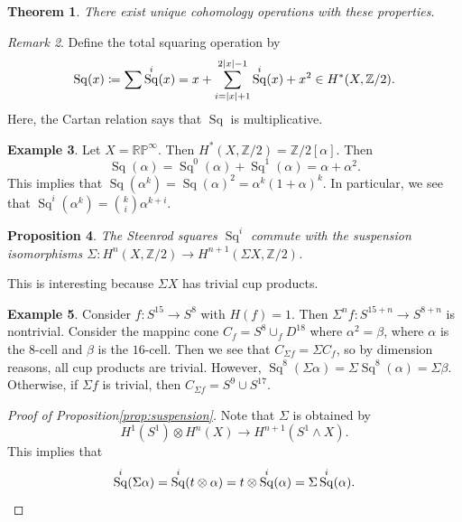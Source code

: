 \documentclass[leqno, openany]{memoir}
\newtheorem{thm}{Theorem}[section]
\newtheorem{prop}[thm]{Proposition}
\theoremstyle{definition}
\newtheorem{exm}[thm]{Example}
\theoremstyle{remark}
\newtheorem{rmk}[thm]{Remark}
\theoremstyle{plain}
\theoremstyle{definition}
\theoremstyle{remark}
\newcommand{\R}{\mathbb{R}}
\newcommand{\Z}{\mathbb{Z}}
\renewcommand{\P}{\mathbb{P}}
\DeclareMathOperator{\Sq}{Sq}
\begin{document}
\begin{thm}\label{thm:steenrodsquare}
    There exist unique cohomology operations with these properties.
\end{thm}

\begin{rmk}
    Define the total squaring operation by
    \begin{align*}
        \Sq(x) \coloneqq \sum \Sq^i(x) = x + \sum_{i = \abs{x}+1}^{2 \abs{x}-1} \Sq^i(x) + x^2 \in H^*(X, \Z/2).
    \end{align*}
    Here, the Cartan relation says that $\Sq$ is multiplicative.
\end{rmk}

\begin{exm}
    Let $X = \R\P^{\infty}$. Then $H^*(X, \Z/2) = \Z/2[\alpha]$. Then 
    \[ \Sq(\alpha) = \Sq^0(\alpha) + \Sq^1(\alpha) = \alpha + \alpha^2. \] 
    This implies that $\Sq(\alpha^k) = {\Sq(\alpha)}^2 = \alpha^k {(1+\alpha)}^k$. In particular, we see that $\Sq^i(\alpha^k) = \binom{k}{i} \alpha^{k+i}$.
\end{exm}

\begin{prop}\label{prop:suspension}
    The Steenrod squares $\Sq^i$ commute with the suspension isomorphisms $\Sigma \colon H^n(X, \Z/2) \to H^{n+1}(\Sigma X, \Z/2)$.
\end{prop}

This is interesting because $\Sigma X$ has trivial cup products.

\begin{exm}
    Consider $f \colon S^{15} \to S^8$ with $H(f) = 1$. Then $\Sigma^n f \colon S^{15+n} \to S^{8+n}$ is nontrivial. Consider the mappinc cone $C_f = S^8 \cup_f D^{18}$ where $\alpha^2 = \beta$, where $\alpha$ is the $8$-cell and $\beta$ is the $16$-cell. Then we see that $C_{\Sigma f} = \Sigma C_f$, so by dimension reasons, all cup products are trivial. However, $\Sq^8(\Sigma \alpha) = \Sigma \Sq^8(\alpha) = \Sigma \beta$. Otherwise, if $\Sigma f$ is trivial, then $C_{\Sigma f} = S^9 \cup S^{17}$.
\end{exm}

\begin{proof}[Proof of Proposition\autoref{prop:suspension}]
    Note that $\Sigma$ is obtained by
    \[ H^1(S^1) \otimes H^n(X) \to H^{n+1}(S^1 \wedge X). \]
    This implies that
    \[ \Sq^i(\Sigma \alpha) = \Sq^i(t \otimes \alpha) = t \otimes \Sq^i(\alpha) = \Sigma \Sq^i(\alpha). \qedhere \]
\end{proof}
\end{document}
